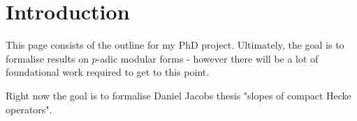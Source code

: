 \chapter{Introduction}

This page consists of the outline for my PhD project. Ultimately, the goal is to formalise results
on $p$-adic modular forms - however there will be a lot of foundational work required to get to this
point.

Right now the goal is to formalise Daniel Jacobs thesis "slopes of compact Hecke operators".
